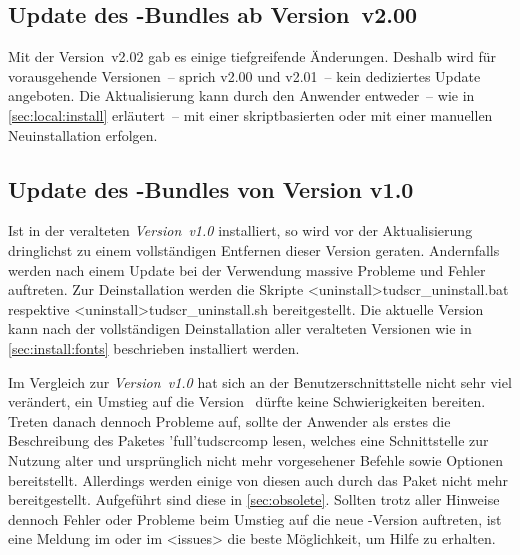 \subsection{Update des \TUDScript-Bundles ab Version~v2.00}
%
Mit der Version~v2.02 gab es einige tiefgreifende Änderungen. Deshalb wird für 
vorausgehende Versionen~-- sprich v2.00 und v2.01~-- kein dediziertes Update 
angeboten. Die Aktualisierung kann durch den Anwender entweder~-- wie in 
\autoref{sec:local:install} erläutert~-- mit einer skriptbasierten oder mit 
einer manuellen Neuinstallation erfolgen.%
%



\subsection{Update des \TUDScript-Bundles von Version v1.0}
%
Ist \TUDScript in der veralteten \emph{Version~v1.0} installiert, so wird vor 
der Aktualisierung dringlichst zu einem vollständigen Entfernen dieser Version 
geraten. Andernfalls werden nach einem Update bei der Verwendung massive 
Probleme und Fehler auftreten. Zur Deinstallation werden die Skripte 
\GitHubDownload*<uninstall>{tudscr_uninstall.bat} respektive
\GitHubDownload*<uninstall>{tudscr_uninstall.sh} bereitgestellt. Die aktuelle 
Version~\vTUDScript{} kann nach der vollständigen Deinstallation aller 
veralteten Versionen wie in \autoref{sec:install:fonts} beschrieben installiert 
werden.

Im Vergleich zur \emph{Version~v1.0} hat sich an der Benutzerschnittstelle 
nicht sehr viel verändert, ein Umstieg auf die Version~\vTUDScript{} dürfte 
keine Schwierigkeiten bereiten. Treten danach dennoch Probleme auf, sollte der 
Anwender als erstes die Beschreibung des Paketes \Package'full'{tudscrcomp} 
lesen, welches eine Schnittstelle zur Nutzung alter und ursprünglich nicht mehr 
vorgesehener Befehle sowie Optionen bereitstellt. Allerdings werden einige von 
diesen auch durch das Paket  nicht mehr bereitgestellt. 
Aufgeführt sind diese in \autoref{sec:obsolete}. Sollten trotz aller Hinweise 
dennoch Fehler oder Probleme beim Umstieg auf die neue \TUDScript-Version 
auftreten, ist eine Meldung im \Forum oder im \GitHubRepo<issues> die 
beste Möglichkeit, um Hilfe zu erhalten.



